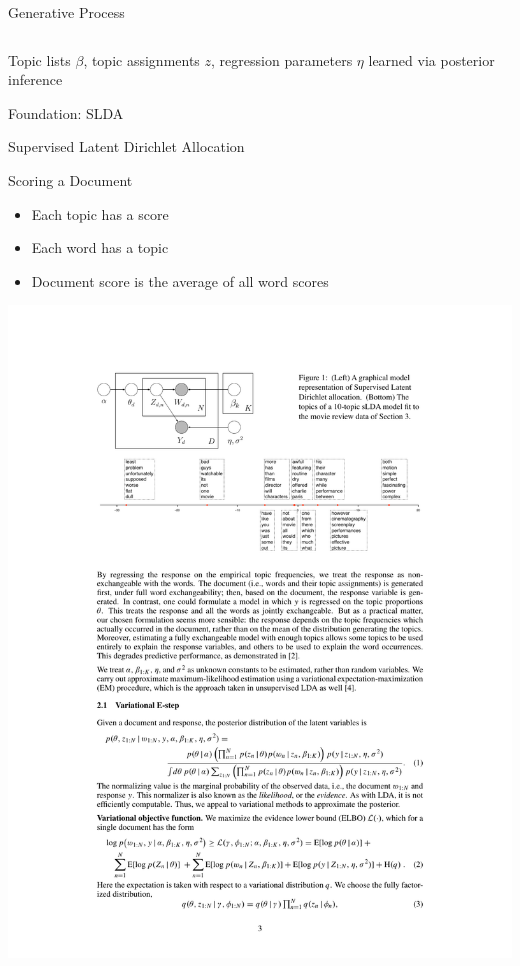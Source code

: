 {\begin{columns}
\begin{block}{Generative Process}
		  \end{block}
	\end{columns}

	\begin{center}
Topic lists $\beta$, topic assignments $z$, regression parameters $\eta$ learned via posterior inference
	\end{center}
}

\fi

\begin{frame}{Foundation: SLDA}

  Supervised Latent Dirichlet Allocation~\cite{blei-07b}

	\begin{block}{Scoring a Document}
		\begin{itemize}
			\item Each topic has a score
			\item Each word has a topic
			\item Document score is the average of all word scores
		\end{itemize}
	\end{block}

	\begin{center}
	\includegraphics[width=.9\linewidth]{mlslda/slda_example}
	\end{center}

\end{frame}

